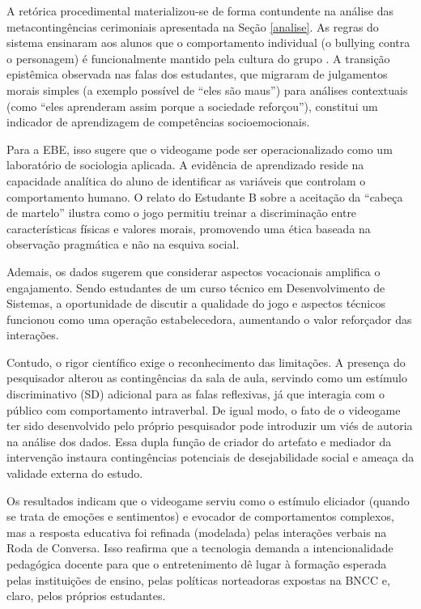 \documentclass[portuguese]{textolivre}
\begin{document}
A retórica procedimental \cite{bogost2011how} materializou-se de forma contundente na análise das metacontingências cerimoniais apresentada na Seção \ref{analise}. As regras do sistema ensinaram aos alunos que o comportamento individual (o bullying contra o personagem) é funcionalmente mantido pela cultura do grupo \cite{todorov2004analise}. A transição epistêmica observada nas falas dos estudantes, que migraram de julgamentos morais simples (a exemplo possível de “eles são maus”) para análises contextuais (como “eles aprenderam assim porque a sociedade reforçou”), constitui um indicador de aprendizagem de competências socioemocionais.

Para a EBE, isso sugere que o videogame pode ser operacionalizado como um laboratório de sociologia aplicada. A evidência de aprendizado reside na capacidade analítica do aluno de identificar as variáveis que controlam o comportamento humano. O relato do Estudante B sobre a aceitação da “cabeça de martelo” ilustra como o jogo permitiu treinar a discriminação entre características físicas e valores morais, promovendo uma ética baseada na observação pragmática e não na esquiva social.

Ademais, os dados sugerem que considerar aspectos vocacionais amplifica o engajamento. Sendo estudantes de um curso técnico em Desenvolvimento de Sistemas, a oportunidade de discutir a qualidade do jogo e aspectos técnicos funcionou como uma operação estabelecedora, aumentando o valor reforçador das interações.

Contudo, o rigor científico exige o reconhecimento das limitações. A presença do pesquisador alterou as contingências da sala de aula, servindo como um estímulo discriminativo (SD) adicional para as falas reflexivas, já que interagia com o público com comportamento intraverbal. De igual modo, o fato de o videogame ter sido desenvolvido pelo próprio pesquisador pode introduzir um viés de autoria na análise dos dados. Essa dupla função de criador do artefato e mediador da intervenção instaura contingências potenciais de desejabilidade social e ameaça da validade externa do estudo.

Os resultados indicam que o videogame serviu como o estímulo eliciador (quando se trata de emoções e sentimentos) e evocador de comportamentos complexos, mas a resposta educativa foi refinada (modelada) pelas interações verbais na Roda de Conversa. Isso reafirma que a tecnologia demanda a intencionalidade pedagógica docente para que o entretenimento dê lugar à formação esperada pelas instituições de ensino, pelas políticas norteadoras expostas na BNCC \cite{brasil2018bncc} e, claro, pelos próprios estudantes.
\end{document}
